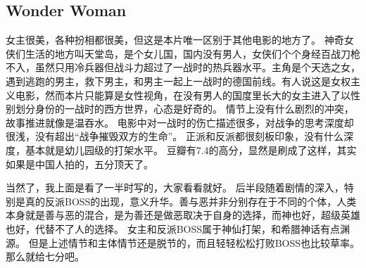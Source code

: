 \subsection{Wonder Woman}

女主很美，各种扮相都很美，但这是本片唯一区别于其他电影的地方了。
神奇女侠们生活的地方叫天堂岛，是个女儿国，国内没有男人，女侠们个个身经百战刀枪不入，虽然只用冷兵器但战斗力超过了一战时的热兵器水平。主角是个天选之女，遇到逃跑的男主，救下男主，和男主一起上一战时的德国前线。有人说这是女权主义电影，然而本片只能算是女性视角，在没有男人的国度里长大的女主进入了以性别划分身份的一战时的西方世界，心态是好奇的。
情节上没有什么剧烈的冲突，故事推进就像是温吞水。
电影中对一战时的伤亡描述很多，对战争的思考深度却很浅，没有超出“战争摧毁双方的生命”。
正派和反派都很刻板印象，没有什么深度，基本就是幼儿园级的打架水平。
豆瓣有7.4的高分，显然是刷成了这样，其实如果是中国人拍的，五分顶天了。

当然了，我上面是看了一半时写的，大家看看就好。
后半段随着剧情的深入，特别是真的反派BOSS的出现，意义升华。善与恶并非分别存在于不同的个体，人类本身就是善与恶的混合，是为善还是做恶取决于自身的选择，而神也好，超级英雄也好，代替不了人的选择。
女主和反派BOSS属于神仙打架，和希腊神话有点渊源。
但是上述情节和主体情节还是脱节的，而且轻轻松松打败BOSS也比较草率。
那么就给七分吧。